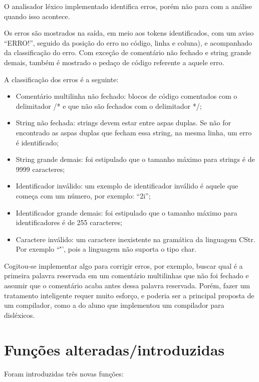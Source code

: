 \documentclass[12pt]{article}
\begin{document}
\indent

O analisador léxico implementado identifica erros, porém não para com a análise quando isso acontece.

Os erros são mostrados na saída, em meio aos tokens identificados, com um aviso ``ERRO!'', seguido da posição do erro no código, linha e coluna), e acompanhado da classificação do erro. Com exceção de comentário não fechado e string grande demais, também é mostrado o pedaço de código referente a aquele erro.

A classificação dos erros é a seguinte:
\begin{itemize}
	\item Comentário multilinha não fechado: blocos de código comentados com o delimitador /* e que não são fechados com o delimitador */;
	\item String não fechada: strings devem estar entre aspas duplas. Se não for encontrado as aspas duplas que fecham essa string, na mesma linha, um erro é identificado;
	\item String grande demais: foi estipulado que o tamanho máximo para strings é de 9999 caracteres;
	\item Identificador inválido: um exemplo de identificador inválido é aquele que começa com um número, por exemplo: ``2i'';
	\item Identificador grande demais: foi estipulado que o tamanho máximo para identificadores é de 255 caracteres;
	\item Caractere inválido: um caractere inexistente na gramática da linguagem CStr. Por exemplo ``\''', pois a linguagem não suporta o tipo char.\\
\end{itemize}

Cogitou-se implementar algo para corrigir erros, por exemplo, buscar qual é a primeira palavra reservada em um comentário multilinhas que não foi fechado e assumir que o comentário acaba antes dessa palavra reservada. Porém, fazer um tratamento inteligente requer muito esforço, e poderia ser a principal proposta de um compilador, como a do aluno que implementou um compilador para disléxicos.

\section{Funções alteradas/introduzidas}

\indent

Foram introduzidas três novas funções:
\end{document}
